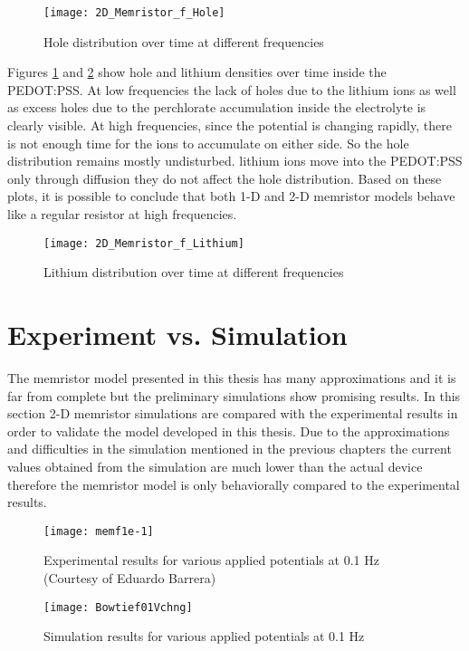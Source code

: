 \begin{doublespace}
\begin{figure}[!htp]
\centering
\texttt{[image: 2D\_Memristor\_f\_Hole]}
\caption{Hole distribution over time at different frequencies} 
\label{fhole}
\end{figure}

Figures \ref{fhole} and \ref{flit} show hole and lithium densities over time inside the PEDOT:PSS. At low frequencies the lack of holes due to the lithium ions as well as excess holes due to the perchlorate accumulation inside the electrolyte is clearly visible. At high frequencies, since the potential is changing rapidly, there is not enough time for the ions to accumulate on either side. So the hole distribution remains mostly undisturbed.  lithium ions move into the PEDOT:PSS only through diffusion  they do not affect the hole distribution. Based on these plots, it is possible to conclude that both 1-D and 2-D memristor models behave like a regular resistor at high frequencies. 


\begin{figure}[!htp]
\centering
\texttt{[image: 2D\_Memristor\_f\_Lithium]}
\caption{Lithium distribution over time at different frequencies} 
\label{flit}
\end{figure}


\clearpage
\section{Experiment vs. Simulation}

The memristor model presented in this thesis has many approximations and it is far from complete but the preliminary simulations show promising results. In this section 2-D memristor simulations are compared with the experimental results in order to validate the model developed in this thesis. Due to the approximations and difficulties in the simulation mentioned in the previous chapters the current values obtained from the simulation are much lower than the actual device therefore the memristor model is only behaviorally compared to the experimental results. 


\begin{figure}[!htp]
\centering
\texttt{[image: memf1e-1]}
\caption{Experimental results for various applied potentials at 0.1 Hz (Courtesy of Eduardo Barrera)\cite{eduardo2}} 
\label{memf1e-1}
\end{figure}

\begin{figure}[!htp]
\centering
\texttt{[image: Bowtief01Vchng]}
\caption{Simulation results for various applied potentials at 0.1 Hz} 
\label{Bowtief01Vchng}
\end{figure}


\end{doublespace}
